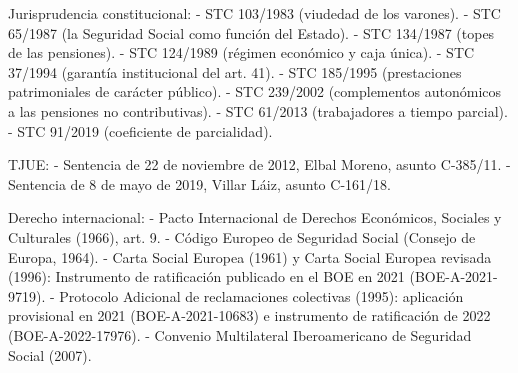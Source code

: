 \documentclass[10pt,a4paper]{article}
\begin{document}
Jurisprudencia constitucional:
- STC 103/1983 (viudedad de los varones).
- STC 65/1987 (la Seguridad Social como función del Estado).
- STC 134/1987 (topes de las pensiones).
- STC 124/1989 (régimen económico y caja única).
- STC 37/1994 (garantía institucional del art. 41).
- STC 185/1995 (prestaciones patrimoniales de carácter público).
- STC 239/2002 (complementos autonómicos a las pensiones no contributivas).
- STC 61/2013 (trabajadores a tiempo parcial).
- STC 91/2019 (coeficiente de parcialidad).

TJUE:
- Sentencia de 22 de noviembre de 2012, Elbal Moreno, asunto C-385/11.
- Sentencia de 8 de mayo de 2019, Villar Láiz, asunto C-161/18.

Derecho internacional:
- Pacto Internacional de Derechos Económicos, Sociales y Culturales (1966), art. 9.
- Código Europeo de Seguridad Social (Consejo de Europa, 1964).
- Carta Social Europea (1961) y Carta Social Europea revisada (1996): Instrumento de ratificación publicado en el BOE en 2021 (BOE-A-2021-9719).
- Protocolo Adicional de reclamaciones colectivas (1995): aplicación provisional en 2021 (BOE-A-2021-10683) e instrumento de ratificación de 2022 (BOE-A-2022-17976).
- Convenio Multilateral Iberoamericano de Seguridad Social (2007).
\end{document}
